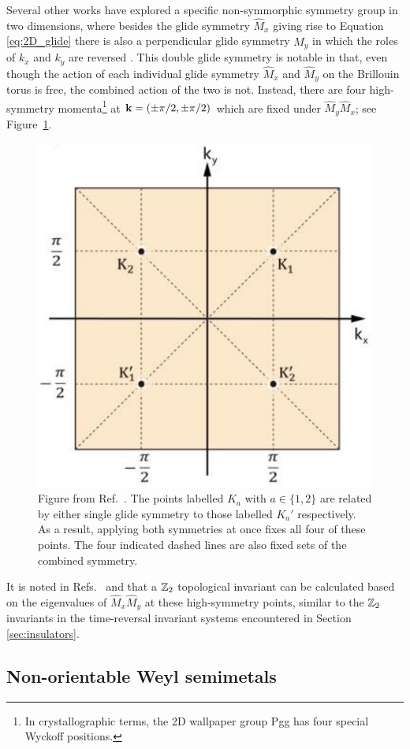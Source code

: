 Several other works have explored a specific non-symmorphic symmetry group in two dimensions, where besides the glide symmetry $\hat{M}_x$ giving rise to Equation \ref{eq:2D_glide} there is also a perpendicular glide symmetry $\hat{M}_y$ in which the roles of $k_x$ and $k_y$ are reversed \cite{HZY_RP2,WangZhang_acoustic-Klein-2D,Tao_quadrupole}. This double glide symmetry is notable in that, even though the action of each individual glide symmetry $\hat{M}_x$ and $\hat{M}_y$ on the Brillouin torus is free, the combined action of the two is not. Instead, there are four high-symmetry momenta\footnote{
	In crystallographic terms, the 2D wallpaper group Pgg has four special Wyckoff positions.}
at $\vb{k} = (\pm\pi/2,\pm\pi/2)$ which are fixed under $\hat{M}_y\hat{M}_x$; see Figure~\ref{fig:Pgg-fixed-points}.
\begin{figure}[htb!]
	\centering
	\includegraphics[width=.5\linewidth]{Images/Pgg-fixed-points}
	\caption{Figure from Ref.~\cite{WangZhang_acoustic-Klein-2D}. The points labelled $K_a$ with $a\in\{1,2\}$ are related by either single glide symmetry to those labelled $K_a'$ respectively. As a result, applying both symmetries at once fixes all four of these points. The four indicated dashed lines are also fixed sets of the combined symmetry.} %
	\label{fig:Pgg-fixed-points}
\end{figure}
It is noted in Refs.~\cite{HZY_RP2} and \cite{WangZhang_acoustic-Klein-2D} that a $\mathbb{Z}_2$ topological invariant can be calculated based on the eigenvalues of $\hat{M}_x\hat{M}_y$ at these high-symmetry points, similar to the $\mathbb{Z}_2$ invariants in the time-reversal invariant systems encountered in Section \ref{sec:insulators}.

\subsection{Non-orientable Weyl semimetals}

